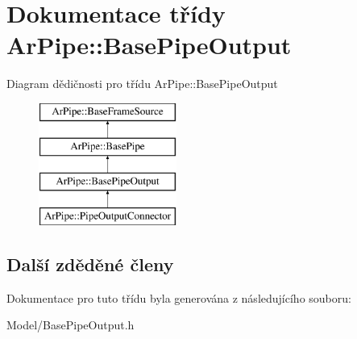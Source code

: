 \hypertarget{class_ar_pipe_1_1_base_pipe_output}{\section{Dokumentace třídy Ar\-Pipe\-:\-:Base\-Pipe\-Output}
\label{dd/dad/class_ar_pipe_1_1_base_pipe_output}
}
Diagram dědičnosti pro třídu Ar\-Pipe\-:\-:Base\-Pipe\-Output\begin{figure}[H]
\begin{center}
\leavevmode
\includegraphics[height=4.000000cm]{dd/dad/class_ar_pipe_1_1_base_pipe_output}
\end{center}
\end{figure}
\subsection*{Další zděděné členy}


Dokumentace pro tuto třídu byla generována z následujícího souboru\-:\begin{DoxyCompactItemize}
\item 
Model/Base\-Pipe\-Output.\-h\end{DoxyCompactItemize}
